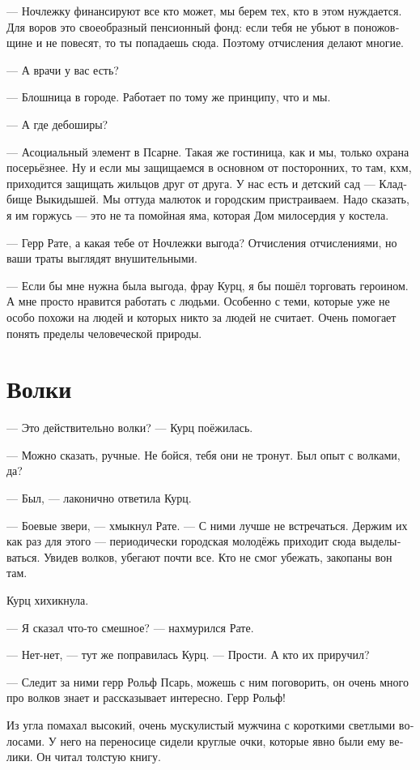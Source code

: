 \documentclass[a4paper,12pt,fleqn]{book}\usepackage{polyglossia}\setdefaultlanguage[babelshorthands=true]{russian}\setotherlanguage{english}\defaultfontfeatures{Ligatures=TeX,Mapping=tex-text}\usepackage{xcolor}\newcommand{\ml}[3]{#2}
\begin{document}
--- Ночлежку финансируют все кто может, мы берем тех, кто в этом нуждается.
Для воров это своеобразный пенсионный фонд: если тебя не убьют в поножовщине и не повесят, то ты попадаешь сюда.
Поэтому отчисления делают многие.

--- А врачи у вас есть?

--- Блошница в городе.
Работает по тому же принципу, что и мы.

--- А где дебоширы?

--- Асоциальный элемент в Псарне.
Такая же гостиница, как и мы, только охрана посерьёзнее.
Ну и если мы защищаемся в основном от посторонних, то там, кхм, приходится защищать жильцов друг от друга.
У нас есть и детский сад --- Кладбище Выкидышей.
Мы оттуда малюток и городским пристраиваем.
Надо сказать, я им горжусь --- это не та помойная яма, которая Дом милосердия у костела.

--- Герр Рате, а какая тебе от Ночлежки выгода?
Отчисления отчислениями, но ваши траты выглядят внушительными.

--- Если бы мне нужна была выгода, фрау Курц, я бы пошёл торговать героином.
А мне просто нравится работать с людьми.
Особенно с теми, которые уже не особо похожи на людей и которых никто за людей не считает.
Очень помогает понять пределы человеческой природы.

\section{Волки}

--- Это действительно волки? --- Курц поёжилась.

--- Можно сказать, ручные.
Не бойся, тебя они не тронут.
Был опыт с волками, да?

--- Был, --- лаконично ответила Курц.

--- Боевые звери, --- хмыкнул Рате.
--- С ними лучше не встречаться.
Держим их как раз для этого --- периодически городская молодёжь приходит сюда выделываться.
Увидев волков, убегают почти все.
Кто не смог убежать, закопаны вон там.

Курц хихикнула.

--- Я сказал что-то смешное? --- нахмурился Рате.

--- Нет-нет, --- тут же поправилась Курц.
--- Прости.
А кто их приручил?

--- Следит за ними герр Рольф Псарь, можешь с ним поговорить, он очень много про волков знает и рассказывает интересно.
Герр Рольф!

Из угла помахал высокий, очень мускулистый мужчина с короткими светлыми волосами.
У него на переносице сидели круглые очки, которые явно были ему велики.
Он читал толстую книгу.
\end{document}
